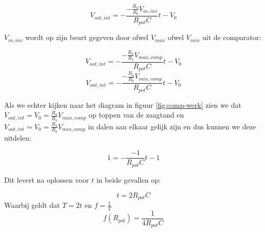 \documentclass{report}
\begin{document}
$$V_{out,int} = -\frac{-\frac{R_{a}}{R_{b}}V_{in,inv}}{R_{pot}C} t - V_{0}$$

\noindent
$V_{in,inv}$ wordt op zijn beurt gegeven door ofwel $V_{max}$ ofwel $V_{min}$ uit de comparator:

$$V_{out,int} = -\frac{-\frac{R_{a}}{R_{b}}V_{max,comp}}{R_{pot}C} t - V_{0}$$
$$V_{out,int} = -\frac{-\frac{R_{a}}{R_{b}}V_{min,comp}}{R_{pot}C} t - V_{0}$$

\noindent
Als we echter kijken naar het diagram in figuur \ref{fig:comp-werk} zien we dat $V_{out,int} = V_{0} = \frac{R_{a}}{R_{b}}V_{max,comp}$ op toppen van de zaagtand en $V_{out,int} = V_{0} = \frac{R_{a}}{R_{b}}V_{min,comp}$ in dalen aan elkaar gelijk zijn en dus kunnen we deze uitdelen:

$$1 = -\frac{-1}{R_{pot}C} t - 1$$

\noindent
Dit levert na oplossen voor $t$ in beide gevallen op:

\begin{equation}
	t = 2R_{pot}C
\end{equation}
\noindent
Waarbij geldt dat $T=2t$ en $f=\frac{1}{T}$
\begin{equation}
\label{eq:freqOscillator}
	f(R_{pot}) = \frac{1}{4R_{pot}C}
\end{equation}
\end{document}
